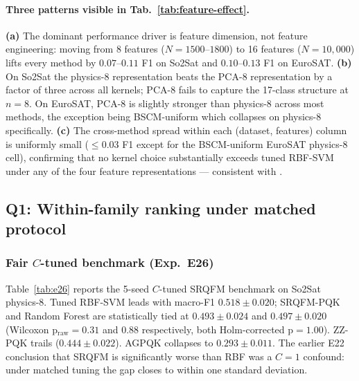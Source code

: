 \documentclass[pdflatex,sn-mathphys-num]{sn-jnl}
\theoremstyle{thmstyleone}
\theoremstyle{thmstyletwo}
\theoremstyle{thmstylethree}
\begin{document}
\paragraph{Three patterns visible in Tab.~\ref{tab:feature-effect}.}
\textbf{(a)} The dominant performance driver is feature dimension,
not feature engineering: moving from 8 features ($N\!=\!1500$--$1800$)
to 16 features ($N\!=\!10{,}000$) lifts every method by $0.07$--$0.11$
F1 on So2Sat and $0.10$--$0.13$ F1 on EuroSAT.
\textbf{(b)} On So2Sat the physics-8 representation beats the PCA-8
representation by a factor of three across all kernels; PCA-8 fails
to capture the 17-class structure at $n=8$. On EuroSAT, PCA-8 is
slightly stronger than physics-8 across most methods, the exception
being BSCM-uniform which collapses on physics-8 specifically.
\textbf{(c)} The cross-method spread within each (dataset, features)
column is uniformly small ($\le 0.03$ F1 except for the BSCM-uniform
EuroSAT physics-8 cell), confirming that no kernel choice
substantially exceeds tuned RBF-SVM under any of the four feature
representations --- consistent with
\cite{heyraud2022,slattery2025,schnabel2025,bowles2024}.

\subsection{Q1: Within-family ranking under matched protocol}

\subsubsection{Fair $C$-tuned benchmark (Exp.\ E26)}\label{sec:e26-results}
Table~\ref{tab:e26} reports the 5-seed $C$-tuned SRQFM benchmark on So2Sat
physics-8. Tuned RBF-SVM leads with macro-F1 $0.518\!\pm\!0.020$;
SRQFM-PQK and Random Forest are statistically tied at
$0.493\!\pm\!0.024$ and $0.497\!\pm\!0.020$ (Wilcoxon p$_\text{raw}=0.31$
and $0.88$ respectively, both Holm-corrected p$=1.00$). ZZ-PQK trails
($0.444\!\pm\!0.022$). AGPQK collapses to $0.293\!\pm\!0.011$.
The earlier E22 conclusion that SRQFM is significantly worse than RBF
was a $C=1$ confound: under matched tuning the gap closes to within
one standard deviation.
\end{document}
